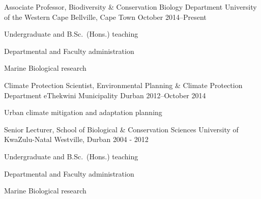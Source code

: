 


\begin{cventries}


\cventry
{Associate Professor, Biodiversity \& Conservation Biology Department} %
{University of the Western Cape} %
{Bellville, Cape Town} %
{October 2014--Present} %
{ %
\begin{cvitems}
\item {Undergraduate and B.Sc.~(Hons.) teaching}
\item {Departmental and Faculty administration}
\item {Marine Biological research}
\end{cvitems}
}


\cventry
{Climate Protection Scientist, Environmental Planning \& Climate Protection Department} %
{eThekwini Municipality} %
{Durban} %
{2012--October 2014} %
{ %
\begin{cvitems}
\item {Urban climate mitigation and adaptation planning}
\end{cvitems}
}


\cventry
{Senior Lecturer, School of Biological \& Conservation Sciences} %
{University of KwaZulu-Natal} %
{Westville, Durban} %
{2004 - 2012} %
{ %
\begin{cvitems}
\item {Undergraduate and B.Sc.~(Hons.) teaching}
\item {Departmental and Faculty administration}
\item {Marine Biological research}
\end{cvitems}
}


\end{cventries}
